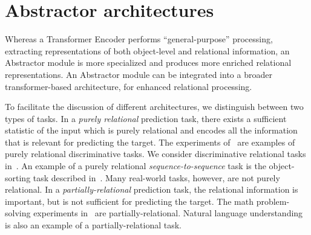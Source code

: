 \section{Abstractor architectures}\label{sec:abstractor_architectures}


Whereas a Transformer Encoder performs ``general-purpose'' processing, extracting representations of both object-level and relational information, an Abstractor module is more specialized and produces more enriched relational representations. An Abstractor module can be integrated into a broader transformer-based architecture, for enhanced relational processing.

To facilitate the discussion of different architectures, we distinguish between two types of tasks. In a \textit{purely relational} prediction task, there exists a sufficient statistic of the input which is purely relational and encodes all the information that is relevant for predicting the target. The experiments of~\citep{esbn,kerg2022neural} are examples of purely relational discriminative tasks. We consider discriminative relational tasks in~. An example of a purely relational \textit{sequence-to-sequence} task is the object-sorting task described in~.
Many real-world tasks, however, are not purely relational. In a \textit{partially-relational} prediction task, the relational information is important, but is not sufficient for predicting the target. The math problem-solving experiments in~ are partially-relational. Natural language understanding is also an example of a partially-relational task.

